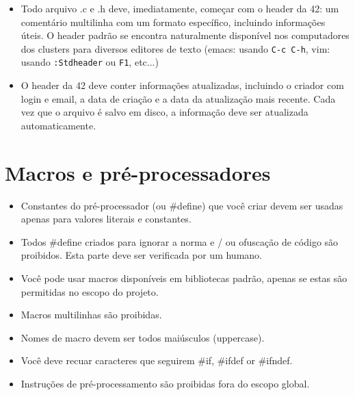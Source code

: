 \documentclass{42-pt}
\begin{document}
        \begin{itemize}

        \item Todo arquivo .c e .h deve, imediatamente, começar com o header da 42:
          um comentário multilinha com um formato específico, incluindo informações
          úteis. O header padrão se encontra naturalmente disponível nos computadores
          dos clusters para diversos editores de texto (emacs: usando \texttt{C-c C-h},
          vim: usando \texttt{:Stdheader} ou \texttt{F1}, etc...)

        \item O header da 42 deve conter informações atualizadas, incluindo o
          criador com login e email, a data de criação e a data da atualização
          mais recente. Cada vez que o arquivo é salvo em disco, a informação deve ser atualizada automaticamente.

        \end{itemize}
        \newpage
        
                
    \section{Macros e pré-processadores}

        \begin{itemize}

            \item Constantes do pré-processador (ou \#define) que você criar devem ser usadas
                apenas para valores literais e constantes.
            \item Todos \#define criados para ignorar a norma e / ou ofuscação de
                código são proibidos. Esta parte deve ser verificada por um humano.
            \item Você pode usar macros disponíveis em bibliotecas padrão, apenas
                se estas são permitidas no escopo do projeto.
            \item Macros multilinhas são proibidas.
            \item Nomes de macro devem ser todos maiúsculos (uppercase).
            \item Você deve recuar caracteres que seguirem \#if, \#ifdef
                or \#ifndef.
	\item Instruções de pré-processamento são proibidas fora do escopo global.
        \end{itemize}
        \newpage
\end{document}

